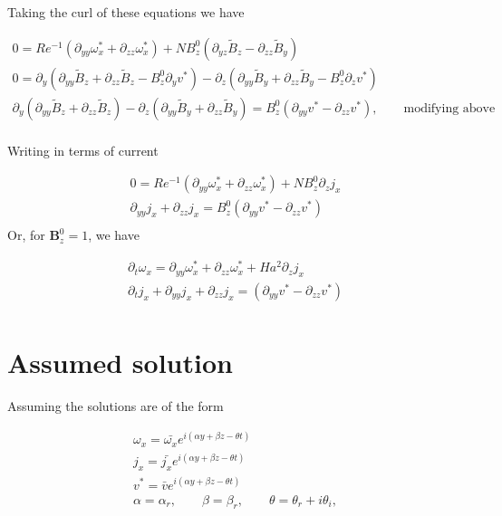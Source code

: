 \documentclass[11pt]{article}
\newcommand{\B}{\mathbf{B}}
\newcommand{\BT}{\tilde{B}}
\newcommand{\PD}{\partial}
\begin{document}
Taking the curl of these equations we have

\begin{equation}\begin{aligned}
0 = Re^{-1} (\PD_{yy} \omega_x^* + \PD_{zz} \omega_x^*) + N B_z^0 (\PD_{yz} \BT_z - \PD_{zz} \BT_y) \\
0 = \PD_y (\PD_{yy} \BT_z + \PD_{zz} \BT_z - B_z^0 \PD_y v^*) - \PD_z (\PD_{yy} \BT_y + \PD_{zz} \BT_y - B_z^0 \PD_z v^*) \\
\PD_y (\PD_{yy} \BT_z + \PD_{zz} \BT_z) - \PD_z (\PD_{yy} \BT_y + \PD_{zz} \BT_y) = B_z^0 (\PD_{yy} v^* - \PD_{zz} v^*), \qquad \text{modifying above} \\
\end{aligned}\end{equation}

Writing in terms of current

\begin{equation}\begin{aligned}
0 = Re^{-1} (\PD_{yy} \omega_x^* + \PD_{zz} \omega_x^*) + N B_z^0 \PD_{z} j_x \\
\PD_{yy} j_x + \PD_{zz} j_x = B_z^0 (\PD_{yy} v^* - \PD_{zz} v^*) \\
\end{aligned}\end{equation}
Or, for $\B_z^0 = 1$, we have

\begin{equation}\boxed{\begin{aligned}
\PD_t \omega_x = \PD_{yy} \omega_x^* + \PD_{zz} \omega_x^* + Ha^2 \PD_{z} j_x \\
\PD_t j_x + \PD_{yy} j_x + \PD_{zz} j_x = (\PD_{yy} v^* - \PD_{zz} v^*) \\
\end{aligned}}\end{equation}

\section{Assumed solution}

Assuming the solutions are of the form

\begin{equation}\begin{aligned}
\omega_x = \bar{\omega_x} e^{i(\alpha y + \beta z - \theta t)} \\
j_x      = \bar{j_x}      e^{i(\alpha y + \beta z - \theta t)} \\
v^*      = \bar{v}        e^{i(\alpha y + \beta z - \theta t)} \\
\alpha = \alpha_r, \qquad \beta = \beta_r, \qquad \theta = \theta_r + i \theta_i,  \\
\end{aligned}\end{equation}
\end{document}
